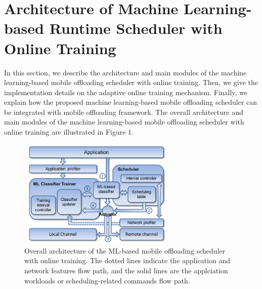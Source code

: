 \documentclass[10pt, conference, compsocconf]{IEEEtran}
\begin{document}
\section{Architecture of Machine Learning-based Runtime Scheduler with
Online Training}
%
In this section, we describe the architecture and main modules of the
machine learning-based mobile offloading scheduler with online training.
%
Then, we give the implementation details on the adaptive online training
mechanism.
%
Finally, we explain how the proposed machine learning-based mobile
offloading scheduler can be integrated with mobile offloading framework.
%
The overall architecture and main modules of the machine learning-based
mobile offloading scheduler with online training are illustrated in
Figure 1.
%
\begin{figure}
\centering
\includegraphics[height=5.2cm, width=7.6cm]{Figure/figure1}
\caption{Overall architecture of the ML-based mobile offloading
scheduler with online training. The dotted lines indicate the
application and network features flow path, and the solid lines are the
applciation workloads or scheduling-related commands flow path.}
\end{figure}
%
\end{document}
